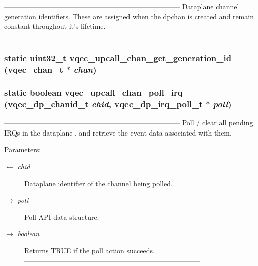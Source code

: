 --------------------------------------------------------------------------- Dataplane channel generation identifiers. These are assigned when the dpchan is created and remain constant throughout it's lifetime. --------------------------------------------------------------------------- 
\subsubsection{\setlength{\rightskip}{0pt plus 5cm}static uint32\_\-t vqec\_\-upcall\_\-chan\_\-get\_\-generation\_\-id (\bf{vqec\_\-chan\_\-t} $\ast$ {\em chan})\hspace{0.3cm}{\tt  [inline, static]}}\label{vqec__upcall__event_8c_bc742cbb3e686707780af369beb9ce02}


\subsubsection{\setlength{\rightskip}{0pt plus 5cm}static boolean vqec\_\-upcall\_\-chan\_\-poll\_\-irq (vqec\_\-dp\_\-chanid\_\-t {\em chid}, vqec\_\-dp\_\-irq\_\-poll\_\-t $\ast$ {\em poll})\hspace{0.3cm}{\tt  [static]}}\label{vqec__upcall__event_8c_6b0f0c8a42125f47a809aa63ed3ce298}


--------------------------------------------------------------------------- Poll / clear all pending IRQs in the dataplane , and retrieve the event data associated with them.

\begin{Desc}
\item[Parameters:]
\begin{description}
\item[\mbox{$\leftarrow$} {\em chid}]Dataplane identifier of the channel being polled. \item[\mbox{$\rightarrow$} {\em poll}]Poll API data structure. \item[\mbox{$\rightarrow$} {\em boolean}]Returns TRUE if the poll action succeeds. --------------------------------------------------------------------------- \end{description}
\end{Desc}
